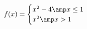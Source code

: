 \documentclass[preview]{standalone}
\begin{document}
\begin{align*}
f(x)=\begin{cases}x^2-4 \amp x \leq 1\\x^2 \amp x>1\end{cases}
\end{align*}
\end{document}
